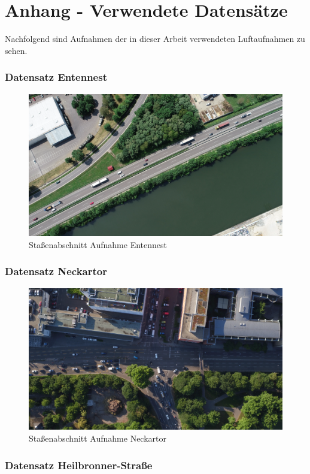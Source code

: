 
\chapter{Anhang - Verwendete Datensätze}
\label{cha:anhang_a}

Nachfolgend sind Aufnahmen der in dieser Arbeit verwendeten Luftaufnahmen zu sehen.

\subsection*{Datensatz Entennest}

\begin{figure}[H]
\centering
    \includegraphics[width=0.6\linewidth]{resources/img/Anhang/Entennest}
\caption{Staßenabschnitt Aufnahme Entennest}
\label{fig:anhang_ds_entennest}
\end{figure}

\subsection*{Datensatz Neckartor}

\begin{figure}[H]
\centering
    \includegraphics[width=0.6\linewidth]{resources/img/Anhang/Neckartor}
\caption{Staßenabschnitt Aufnahme Neckartor}
\label{fig:anhang_ds_neckartor}
\end{figure}

\subsection*{Datensatz Heilbronner-Straße}

